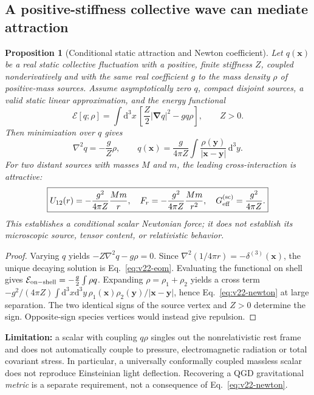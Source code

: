 \documentclass[11pt,a4paper]{article}
\newtheorem{proposition}[theorem]{Proposition}
\theoremstyle{remark}\newtheorem{remark}[theorem]{Remark}
\newcommand{\dd}{\mathrm d}\newcommand{\Tr}{\operatorname{Tr}}\newcommand{\cO}{\mathcal O}\newcommand{\cG}{\mathcal G}\newcommand{\cH}{\mathcal H}\newcommand{\cE}{\mathcal E}\newcommand{\cK}{\mathcal K}\newcommand{\AX}{\textsf{[AXIOM]}}\newcommand{\D}{\textsf{[DERIVED]}}\newcommand{\C}{\textsf{[CONDITIONAL]}}\newcommand{\OPEN}{\textsf{[OPEN]}}
\begin{document}
\subsection{A positive-stiffness collective wave can mediate attraction}\label{sec:v22-attraction}
\begin{proposition}[Conditional static attraction and Newton coefficient]\label{prop:v22-attraction}
Let $q(\bm x)$ be a real static collective fluctuation with a positive, finite stiffness $Z$, coupled nonderivatively and with the same real coefficient $g$ to the \emph{mass density} $\rho$ of positive-mass sources. Assume asymptotically zero $q$, compact disjoint sources, a valid static linear approximation, and the energy functional
\begin{equation}\label{eq:v22-energy}
 \mathcal E[q;\rho]=\int\!\dd^3x\,\left[\frac Z2|\bm\nabla q|^2-gq\rho\right],\qquad Z>0.
\end{equation}
Then minimization over $q$ gives
\begin{equation}\label{eq:v22-eom}
 \nabla^2q=-\frac gZ\rho,\qquad q(\bm x)=\frac g{4\pi Z}\int\!\frac{\rho(\bm y)}{|\bm x-\bm y|}\,\dd^3y.
\end{equation}
For two distant sources with masses $M$ and $m$, the leading cross-interaction is attractive:
\begin{equation}\label{eq:v22-newton}
 \boxed{U_{12}(r)=-\frac{g^2}{4\pi Z}\frac{Mm}{r},\quad
 F_r=-\frac{g^2}{4\pi Z}\frac{Mm}{r^2},\quad
 G_{\rm eff}^{\rm(sc)}=\frac{g^2}{4\pi Z}.}
\end{equation}
This establishes a \emph{conditional scalar Newtonian force}; it does not establish its microscopic source, tensor content, or relativistic behavior.
\end{proposition}
\begin{proof}
Varying $q$ yields $-Z\nabla^2q-g\rho=0$. Since $\nabla^2(1/4\pi r)=-\delta^{(3)}(\bm x)$, the unique decaying solution is Eq.~\eqref{eq:v22-eom}. Evaluating the functional on shell gives $\mathcal E_{\rm on-shell}=-\tfrac g2\int\rho q$. Expanding $\rho=\rho_1+\rho_2$ yields a cross term $-g^2/(4\pi Z)\int\dd^3x\dd^3y\,\rho_1(\bm x)\rho_2(\bm y)/|\bm x-\bm y|$, hence Eq.~\eqref{eq:v22-newton} at large separation. The two identical signs of the source vertex and $Z>0$ determine the sign. Opposite-sign species vertices would instead give repulsion.
\end{proof}
\textbf{Limitation:} a scalar with coupling $q\rho$ singles out the nonrelativistic rest frame and does not automatically couple to pressure, electromagnetic radiation or total covariant stress. In particular, a universally conformally coupled massless scalar does not reproduce Einsteinian light deflection. Recovering a QGD gravitational \emph{metric} is a separate requirement, not a consequence of Eq.~\eqref{eq:v22-newton}.
\end{document}
